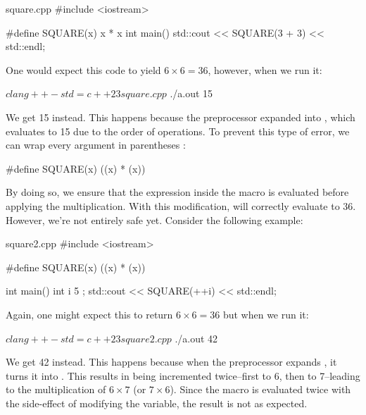 \documentclass[12pt]{article}
\begin{document}
\begin{cxx}{square.cpp}
#include <iostream>

#define SQUARE(x) x * x
int main()
{
	std::cout << SQUARE(3 + 3) << std::endl;
}
\end{cxx}

\noindent
One would expect this code to yield $6 \times 6 = 36$, however, when we run it:

\begin{terminal}
$ clang++ -std=c++23 square.cpp
$ ./a.out
15
\end{terminal}

\noindent
We get 15 instead.
This happens because the preprocessor expanded  into , which evaluates to 15 due to the order of operations.
To prevent this type of error, we can wrap every argument in parentheses \inlinecxx{()}:

\begin{cxx}{}
#define SQUARE(x) ((x) * (x))
\end{cxx}

\noindent
By doing so, we ensure that the expression inside the macro is evaluated before applying the multiplication.
With this modification,  will correctly evaluate to 36.
However, we're not entirely safe yet.
Consider the following example:

\begin{cxx}{square2.cpp}
#include <iostream>

#define SQUARE(x) ((x) * (x))

int main()
{
	int i { 5 };
	std::cout << SQUARE(++i) << std::endl;
}
\end{cxx}

\noindent
Again, one might expect this to return $6\times 6 = 36$ but when we run it:

\begin{terminal}
$ clang++ -std=c++23 square2.cpp
$ ./a.out
42
\end{terminal}

\noindent
We get 42 instead.
This happens because when the preprocessor expands , it turns it into .
This results in  being incremented twice--first to 6, then to 7--leading to the multiplication of $6 \times 7$ (or $7 \times 6$).
Since the macro is evaluated twice with the side-effect of modifying the variable, the result is not as expected.
\end{document}
